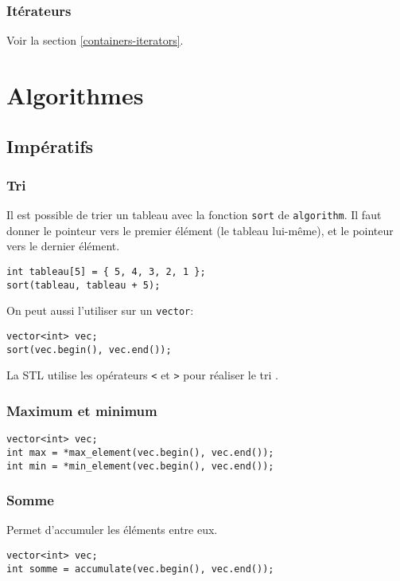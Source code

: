 \documentclass[10pt,a4paper,french]{article}
\begin{document}
\subsubsection{Itérateurs}
Voir la section \cref{containers-iterators}.

\section{Algorithmes}

\subsection{Impératifs}

\subsubsection{Tri}

Il est possible de trier un tableau avec la fonction {\tt sort} de {\tt algorithm}. Il faut donner le pointeur vers le premier élément (le tableau lui-même), et le pointeur vers le dernier élément.

\begin{verbatim}
int tableau[5] = { 5, 4, 3, 2, 1 };
sort(tableau, tableau + 5);
\end{verbatim}

On peut aussi l'utiliser sur un {\tt vector}:
\begin{verbatim}
vector<int> vec;
sort(vec.begin(), vec.end());
\end{verbatim}

La STL utilise les opérateurs {\tt <} et {\tt >} pour réaliser le tri .

\subsubsection{Maximum et minimum}

\begin{verbatim}
vector<int> vec;
int max = *max_element(vec.begin(), vec.end());
int min = *min_element(vec.begin(), vec.end());
\end{verbatim}

\subsubsection{Somme}

Permet d'accumuler les éléments entre eux.

\begin{verbatim}
vector<int> vec;
int somme = accumulate(vec.begin(), vec.end());
\end{verbatim}
\end{document}
